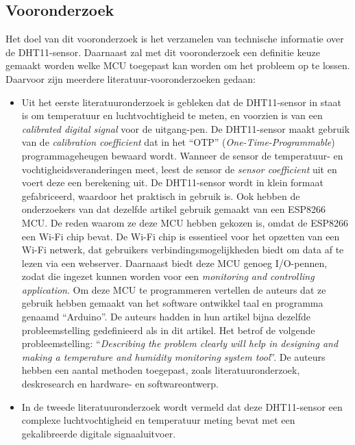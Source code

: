 \subsection{Vooronderzoek}
Het doel van dit vooronderzoek is het verzamelen van technische informatie over de DHT11-sensor. 
Daarnaast zal met dit vooronderzoek een definitie keuze gemaakt worden welke MCU toegepast kan worden om het probleem op te lossen. 
Daarvoor zijn meerdere literatuur-vooronderzoeken gedaan:
\begin{itemize}
    \item[\ding{226}] 
Uit het eerste literatuuronderzoek \cite{novelan2020monitoring} is gebleken dat de DHT11-sensor in staat is om temperatuur en luchtvochtigheid te meten, en 
voorzien is van een \textit{calibrated digital signal} voor de uitgang-pen.
De DHT11-sensor maakt gebruik van de \textit{calibration coefficient} dat in het ``OTP'' (\textit{One-Time-Programmable}) programmageheugen bewaard wordt. 
Wanneer de sensor de temperatuur- en vochtigheidsveranderingen meet, leest de sensor de \textit{sensor coefficient} uit en voert deze een berekening uit. 
De DHT11-sensor wordt in klein formaat gefabriceerd, waardoor het praktisch in gebruik is.  
Ook hebben de onderzoekers van dat dezelfde artikel gebruik gemaakt van een ESP8266 MCU. 
De reden waarom ze deze MCU hebben gekozen is, omdat de ESP8266 een Wi-Fi chip bevat. 
De Wi-Fi chip is essentieel voor het opzetten van een Wi-Fi netwerk, dat gebruikers verbindingsmogelijkheden biedt om data af te lezen via een webserver. 
Daarnaast biedt deze MCU genoeg I/O-pennen, zodat die ingezet kunnen worden voor een \textit{monitoring and controlling application}. 
Om deze MCU te programmeren vertellen de auteurs dat ze gebruik hebben gemaakt van het software ontwikkel taal en programma genaamd ``Arduino''. 
\linebreak\linebreak
De auteurs hadden in hun artikel bijna dezelfde probleemstelling gedefinieerd als in dit artikel. Het betrof de volgende probleemstelling: 
``\textit{Describing the problem clearly will help in designing and making a temperature and humidity monitoring system tool}''. 
De auteurs hebben een aantal methoden toegepast, zoals literatuuronderzoek, deskresearch en hardware- en softwareontwerp. 
\linebreak
    \item[\ding{226}] In de tweede literatuuronderzoek \cite{srivastava2018measurement} wordt vermeld dat deze DHT11-sensor 
een complexe luchtvochtigheid en temperatuur meting bevat met een gekalibreerde digitale signaaluitvoer. 

\end{itemize}

